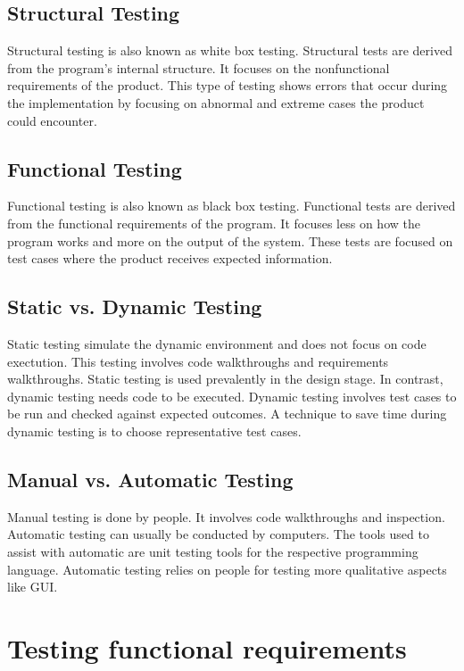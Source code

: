 \documentclass[12pt]{article}
\begin{document}
\subsection{Structural Testing}
Structural testing  is also known as white box testing. Structural tests are derived from the program's internal structure. It focuses on the nonfunctional requirements of the product. This type of testing shows errors that occur during the implementation by focusing on abnormal and extreme cases the product could encounter.
\subsection{Functional Testing}
Functional testing is also known as black box testing. Functional tests are derived from the functional requirements of the program. It focuses less on how the program works and more on the output of the system. These tests are focused on test cases where the product receives expected information.
\subsection{Static vs. Dynamic Testing}
Static testing simulate the dynamic environment and does not focus on code exectution. This testing involves code walkthroughs and requirements walkthroughs. Static testing is used prevalently in the design stage. In contrast, dynamic testing needs code to be executed. \newline\newline
Dynamic testing involves test cases to be run and checked against expected outcomes. A technique to save time during dynamic testing is to choose representative test cases. 
\subsection{Manual vs. Automatic Testing}
Manual testing is done by people. It involves code walkthroughs and inspection. \newline\newline
Automatic testing can usually be conducted by computers. The tools used to assist with automatic are unit testing tools for the respective programming language. Automatic testing relies on people for testing more qualitative aspects like GUI. 


\section{Testing functional requirements}
\end{document}
